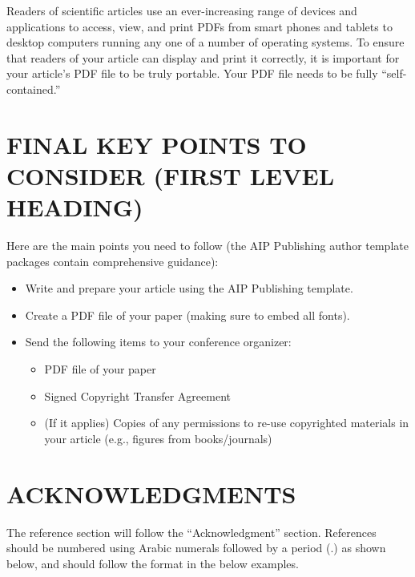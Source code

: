 \documentclass{aip-cp}
\begin{document}
Readers of scientific articles use an ever-increasing range of devices and applications to access, view, and print PDFs  from smart phones and tablets to desktop computers running any one of a number of operating systems. To ensure that readers of  your article can display and print it correctly, it is important for your article's PDF file to be truly portable. Your PDF file needs to be fully ``self-contained.''%

\section{FINAL KEY POINTS TO CONSIDER (FIRST LEVEL HEADING)}
Here are the main points you need to follow (the AIP Publishing author template packages contain comprehensive guidance):

\begin{itemize}
\item Write and prepare your article using the AIP Publishing template.
\item Create a PDF file of your paper (making sure to embed all fonts).
\item Send the following items to your conference organizer:
\begin{itemize}
\item PDF file of your paper
\item Signed Copyright Transfer Agreement
\item (If it applies) Copies of any permissions to re-use copyrighted materials in your article (e.g., figures from books/journals)
\end{itemize}
\end{itemize}




\section{ACKNOWLEDGMENTS}
The reference section will follow the ``Acknowledgment'' section.  References should be numbered using Arabic numerals followed by a period (.) as shown below, and should follow the format in the below examples.




\nocite{*}
%
%
\end{document}
